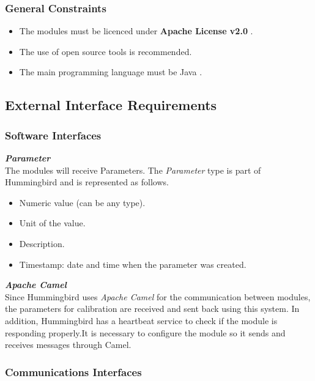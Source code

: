 \subsubsection{General Constraints}

\begin{itemize}
\item The modules must be licenced under \textbf{Apache License v2.0} \cite{AL20}.
\item The use of open source tools is recommended.
\item The main programming language must be Java \cite{Java}.
\end{itemize}

\subsection{External Interface Requirements}

\subsubsection{Software Interfaces}

\textbf{\emph{Parameter}}\\
The modules will receive Parameters. The \emph{Parameter} type is part of Hummingbird and is represented as follows.

\begin{itemize}
\item Numeric value (can be any type).
\item Unit of the value.
\item Description.
\item Timestamp: date and time when the parameter was created.

\end{itemize}


\textbf{\emph{Apache Camel}} \citep{Camel}\\
Since Hummingbird uses \emph{Apache Camel} for the communication between modules, the parameters for calibration are received and sent back using this system. In addition, Hummingbird has a heartbeat service to check if the module is responding properly.It is necessary to configure the module so it sends and receives messages through Camel.


\subsubsection{Communications Interfaces}


